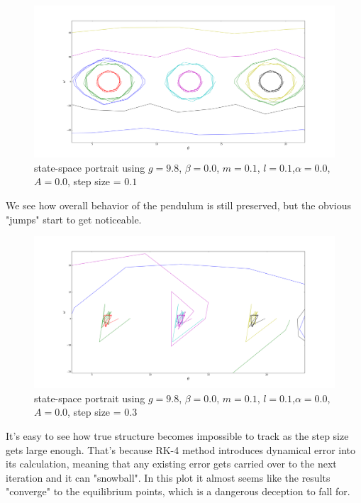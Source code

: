 \documentclass[12pt]{article}\pagestyle{myheadings}
\theoremstyle{plain}
\begin{document}
\section{}

\begin{figure}[H]
\centering
\includegraphics[scale=.15]{7}
\caption{state-space portrait using $g = 9.8$, $\beta = 0.0$, $m = 0.1$, $l = 0.1$,$\alpha = 0.0$, $A = 0.0$, step size = $0.1$}
\label{fig:my_label}
\end{figure}
We see how overall behavior of the pendulum is still preserved, but the obvious "jumps" start to get noticeable. 

\begin{figure}[H]
\centering
\includegraphics[scale=.15]{7_03}
\caption{state-space portrait using $g = 9.8$, $\beta = 0.0$, $m = 0.1$, $l = 0.1$,$\alpha = 0.0$, $A = 0.0$, step size = $0.3$}
\label{fig:my_label}
\end{figure}

It's easy to see how true structure becomes impossible to track as the step size gets large enough. That's because RK-4 method introduces dynamical error into its calculation, meaning that any existing error gets carried over to the next iteration and it can "snowball". In this plot it almost seems like the results "converge" to the equilibrium points, which is a dangerous deception to fall for. 
\end{document}
